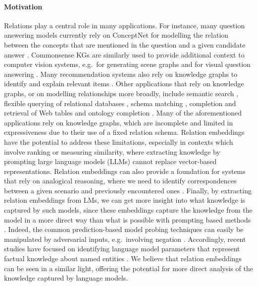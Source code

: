 \documentclass[3p]{elsarticle}
\begin{document}
{\paragraph{Motivation}
Relations play a central role in many applications. For instance, many question answering models currently rely on ConceptNet for modelling the relation between the concepts that are mentioned in the question and a given candidate answer \cite{yasunaga-etal-2021-qa,sun-etal-2022-jointlk,jiang-etal-2022-great}. Commonsense KGs are similarly used to provide additional context to computer vision systems, e.g.\ for generating scene graphs \cite{DBLP:conf/cvpr/GuZL0CL19,DBLP:conf/wacv/ChenRL23} and for visual question answering \cite{DBLP:conf/aaai/WuLSM22}. Many recommendation systems also rely on knowledge graphs to identify and explain relevant items \cite{DBLP:conf/www/WangZXG18,DBLP:conf/kdd/Wang00LC19}. Other applications that rely on knowledge graphs, or on modelling relationships more broadly, include semantic search \cite{info:doi/10.2196/16948,DBLP:conf/sigir/JafarzadehAE22}, flexible querying of relational databases \cite{bordawekar2017using}, schema matching \cite{fernandez2018seeping}, completion and retrieval of Web tables \cite{zhang2019table2vec} and ontology completion \cite{DBLP:conf/aaai/BouraouiS19}. Many of the aforementioned applications rely on knowledge graphs, which are incomplete and limited in expressiveness due to their use of a fixed relation schema. Relation embeddings have the potential to address these limitations, especially in contexts which involve ranking or measuring similarity, where extracting knowledge by prompting large language models (LLMs) cannot replace vector-based representations. Relation embeddings can also provide a foundation for systems that rely on analogical reasoning, where we need to identify correspondences between a given scenario and previously encountered ones \cite{gentner1997structure}. Finally, by extracting relation embeddings from LMs, we can get more insight into what knowledge is captured by such models, since these embeddings capture the knowledge from the model in a more direct way than what is possible with prompting based methods \cite{petroni-etal-2019-language,jiang-etal-2020-know}. Indeed, the common prediction-based model probing techniques \cite{petroni-etal-2019-language,jiang-etal-2020-know} can easily be manipulated by adversarial inputs, e.g.\ involving negation \cite{kassner-schutze-2020-negated}. Accordingly, recent studies have focused on identifying language model parameters that represent factual knowledge about named entities \cite{meng2022locating}. 
We believe that relation embeddings can be seen in a similar light, offering the potential for more direct analysis of the knowledge captured by language models.

}
\end{document}
